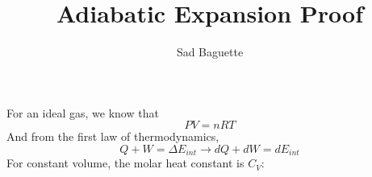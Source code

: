 \documentclass[12pt, letterpaper]{article}
\title{Adiabatic Expansion Proof}
\author{Sad Baguette}
\date{}
\begin{document}
For an ideal gas, we know that 
\[ PV = nRT \]
And from the first law of thermodynamics, 
\[ Q + W = \Delta E_{int} \rightarrow dQ + dW = dE_{int} \]
For constant volume, the molar heat constant is $C_V$: 
\end{document}
